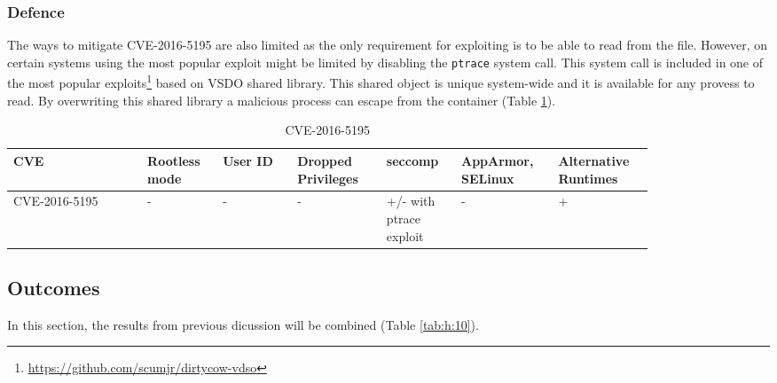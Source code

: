 \subsubsection*{Defence}

The ways to mitigate CVE-2016-5195 are also limited as the only requirement for exploiting is to be able to read from the file. However, on certain systems using the most popular exploit might be limited by disabling the \texttt{ptrace} system call. This system call is included in one of the most popular exploits\footnote{\url{https://github.com/scumjr/dirtycow-vdso}} based on VSDO shared library. This shared object is unique system-wide and it is available for any provess to read. By overwriting this shared library a malicious process can escape from the container (Table \ref{tab:h:9}).

\begin{table}[H]
    \centering \small
    \begin{tabular}{| p{0.18\linewidth} | p{0.1\linewidth} | p{0.1\linewidth} | p{0.12\linewidth} | p{0.1\linewidth} | p{0.12\linewidth} | p{0.12\linewidth} |} \hline
    CVE & Rootless mode & User ID & Dropped Privileges & seccomp & AppArmor, SELinux & Alternative Runtimes \\ \hline
    CVE-2016-5195 & - & - & - & \cellcolor{yellow!25} +/- \linebreak with ptrace exploit & - & \cellcolor{green!25} + \\ \hline
    \end{tabular}
    \caption{CVE-2016-5195}
    \label{tab:h:9}
\end{table}



\FloatBarrier
\clearpage


\subsection{Outcomes}

In this section, the results from previous dicussion will be combined (Table \ref{tab:h:10}).

